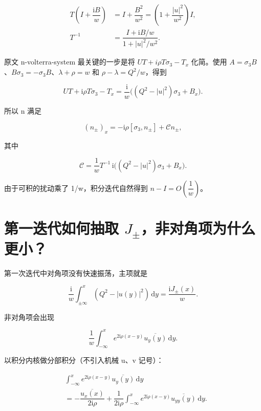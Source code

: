 \[
\begin{aligned}
T\left(I+\dfrac{\mathrm{i}B}{w}\right)
&=I+\dfrac{B^2}{w^2}
=\left(1+\dfrac{|u|^2}{w^2}\right)I,\\
T^{-1}
&=\dfrac{I+\mathrm{i}B/w}{1+|u|^2/w^2}.
\end{aligned}
\]

原文 n-volterra-system 最关键的一步是将 $UT+i\rho{}T\sigma{}_{3}-T_{x}$ 化简。使用 $A=\sigma{}_{3}B$、$B\sigma{}_{3}=-\sigma{}_{3}B$、$\lambda{}+\rho{}=w$ 和 $\rho{}-\lambda{}=Q^{2}/w$，得到\par

\[
UT+\mathrm{i}\rho T\sigma_3-T_x
=\dfrac{\mathrm{i}}{w}\bigl((Q^2-|u|^2)\sigma_3+B_x\bigr).
\]

所以 n 满足\par

\[
(n_\pm)_x=-\mathrm{i}\rho[\sigma_3,n_\pm]
+\mathcal Cn_\pm,
\]

其中\par

\[
\mathcal C=\dfrac{1}{w}T^{-1}
\,\mathrm{i}\bigl((Q^2-|u|^2)\sigma_3+B_x\bigr).
\]

由于可积的扰动乘了 1/w，积分迭代自然得到 $n-I=O(\dfrac{1}{w})$。\par

\section{第一迭代如何抽取 \texorpdfstring{$J_\pm$}{J+-}，非对角项为什么更小？}

第一次迭代中对角项没有快速振荡，主项就是\par

\[
\dfrac{\mathrm{i}}{w}\int_{\pm\infty}^{x}
(Q^2-|u(y)|^2)\,\mathrm{d}y
=\dfrac{\mathrm{i}J_\pm(x)}{w}.
\]

非对角项会出现\par

\[
\dfrac{1}{w}\int_{-\infty}^{x}
e^{2\mathrm{i}\rho(x-y)}\overline{u_y(y)}\,\mathrm{d}y.
\]

以积分内核做分部积分（不引入机械 u、v 记号）：\par

\[
\begin{aligned}
&\int_{-\infty}^{x}
e^{2\mathrm{i}\rho(x-y)}\overline{u_y(y)}\,\mathrm{d}y\\
&=-\dfrac{\overline{u_x(x)}}{2\mathrm{i}\rho}
+\dfrac{1}{2\mathrm{i}\rho}
\int_{-\infty}^{x}
e^{2\mathrm{i}\rho(x-y)}\overline{u_{yy}(y)}\,\mathrm{d}y.
\end{aligned}
\]

